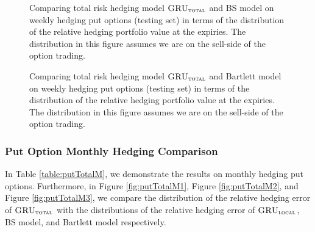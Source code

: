 \documentclass[letterpaper,12pt,titlepage,oneside,final]{book}
\numberwithin{equation}{section}
\theoremstyle{definition}
\newcommand{\modelT}{\textsc{GRU}_{\textsc{total}}}
\newcommand{\modelL}{\textsc{GRU}_{\textsc{local}}}
\begin{document}
\begin{figure}[htp!]
	\caption{Comparing total risk hedging model $\modelT$ and BS model on weekly hedging put options (testing set) in terms of the distribution of the  relative hedging portfolio value at the expiries. The distribution in this figure assumes we are on the sell-side of the option trading.} \label{fig:putTotalW3}
		\centering
	\caption{Comparing total risk hedging model $\modelT$ and Bartlett model on weekly hedging put options (testing set) in terms of the distribution of the  relative hedging portfolio value at the expiries. The distribution in this figure assumes we are on the sell-side of the option trading.} \label{fig:putTotalW2}
\end{figure}

\newpage
\subsubsection{Put Option Monthly Hedging Comparison}
In Table \ref{table:putTotalM}, we demonstrate the results on monthly hedging put options. Furthermore, in Figure \ref{fig:putTotalM1}, Figure \ref{fig:putTotalM2}, and  Figure \ref{fig:putTotalM3}, we compare the distribution of the relative hedging error of $\modelT$ with the distributions of the relative hedging error of $\modelL$, BS model, and Bartlett model respectively.
\end{document}
